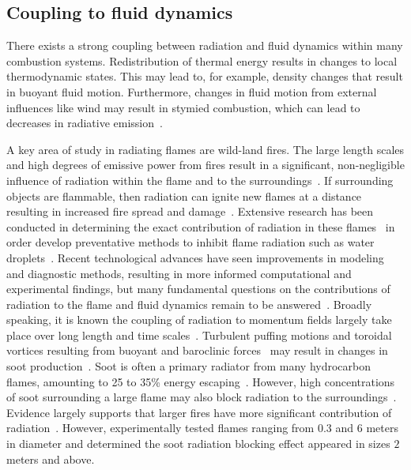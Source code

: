 
\subsection{Coupling to fluid dynamics}
There exists a strong coupling between radiation and fluid dynamics within many combustion systems. Redistribution of thermal energy results in changes to local thermodynamic states. This may lead to, for example, density changes that result in buoyant fluid motion. Furthermore, changes in fluid motion from external influences like wind may result in stymied combustion, which can lead to decreases in radiative emission~\cite{Hu2017AChallenges}.

A key area of study in radiating flames are wild-land fires. The large length scales and high degrees of emissive power from fires result in a significant, non-negligible influence of radiation within the flame and to the surroundings~\cite{Drysdale2011AnDynamics}. If surrounding objects are flammable, then radiation can ignite new flames at a distance resulting in increased fire spread and damage~\cite{Valendik2008EffectEnvironment}. Extensive research has been conducted in determining the exact contribution of radiation in these flames~\cite{Sacadura2005RadiativeScience} in order develop preventative methods to inhibit flame radiation such as water droplets~\cite{Wu2018RadiationStudy}. 
Recent technological advances have seen improvements in modeling and diagnostic methods, resulting in more informed computational and experimental findings, but many fundamental questions on the contributions of radiation to the flame and fluid dynamics remain to be answered~\cite{Finney2013OnSpread}. Broadly speaking, it is known the coupling of radiation to momentum fields largely take place over long length and time scales~\cite{Tieszen2001ONFIRES}. Turbulent puffing motions and toroidal vortices resulting from buoyant and baroclinic forces~\cite{Cetegen1993ExperimentsFires} may result in changes in soot production~\cite{Chen2023PoolAdvances}. Soot is often a primary radiator from many hydrocarbon flames, amounting to 25 to 35\% energy escaping~\cite{Tieszen2001ONFIRES}. However, high concentrations of soot surrounding a large flame may also block radiation to the surroundings~\cite{Hamins1995CharacteristicsBurning}. Evidence largely supports that larger fires have more significant contribution of radiation~\cite{Chen2023PoolAdvances}. However, \citet{Hiroshi1988AirFires} experimentally tested flames ranging from $0.3$ and $6$ meters in diameter and determined the soot radiation blocking effect appeared in sizes $2$ meters and above.


